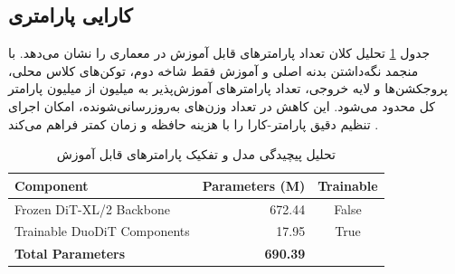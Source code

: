 \subsection{کارایی پارامتری}
جدول \ref{tab:param_count} تحلیل کلان تعداد پارامترهای قابل آموزش در معماری  را نشان می‌دهد. با منجمد نگه‌داشتن بدنه اصلی  و آموزش فقط شاخه دوم، توکن‌های کلاس محلی، پروجکشن‌ها و لایه خروجی، تعداد پارامترهای آموزش‌پذیر به  میلیون از  میلیون پارامتر کل محدود می‌شود. این کاهش در تعداد وزن‌های به‌روزرسانی‌شونده، امکان اجرای تنظیم دقیق پارامتر-کارا را با هزینه حافظه و زمان کمتر فراهم می‌کند \cite{2212.09748,8409325}.

\begin{table}[htbp]
    \centering
    \caption[تحلیل پیچیدگی مدل]{تحلیل پیچیدگی مدل و تفکیک پارامترهای قابل آموزش}
    \label{tab:param_count}
    \begin{latin}
    \begin{tabular}{lrc}
        \hline
        \textbf{Component} & \textbf{Parameters (M)} & \textbf{Trainable} \\
        \hline
        Frozen DiT-XL/2 Backbone & 672.44 & False \\
        Trainable DuoDiT Components & 17.95 & True \\
        \hline
        \textbf{Total Parameters} & \textbf{690.39} & \\
        \hline
    \end{tabular}
    \end{latin}
\end{table}

